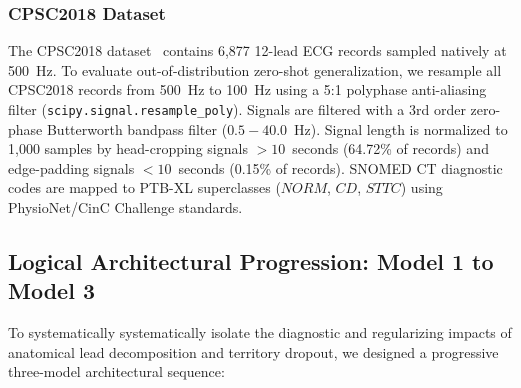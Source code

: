 \documentclass[12pt]{elsarticle}
\begin{document}
\subsubsection{CPSC2018 Dataset}
The CPSC2018 dataset~\cite{liu2018open} contains 6,877 12-lead ECG records sampled natively at 500~Hz. To evaluate out-of-distribution zero-shot generalization, we resample all CPSC2018 records from 500~Hz to 100~Hz using a 5:1 polyphase anti-aliasing filter (\texttt{scipy.signal.resample\_poly}). Signals are filtered with a 3rd order zero-phase Butterworth bandpass filter ($0.5 - 40.0$~Hz). Signal length is normalized to 1,000 samples by head-cropping signals $> 10$~seconds (64.72\% of records) and edge-padding signals $< 10$~seconds (0.15\% of records). SNOMED CT diagnostic codes are mapped to PTB-XL superclasses ($NORM$, $CD$, $STTC$) using PhysioNet/CinC Challenge standards.

\subsection{Logical Architectural Progression: Model 1 to Model 3}
To systematically systematically isolate the diagnostic and regularizing impacts of anatomical lead decomposition and territory dropout, we designed a progressive three-model architectural sequence:
\end{document}
